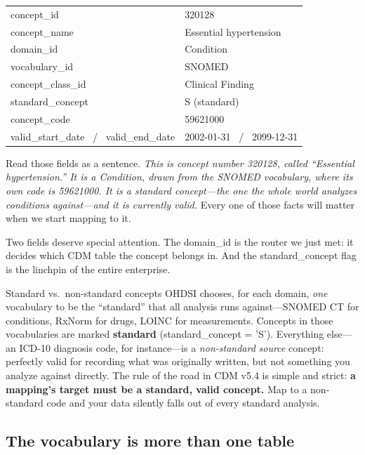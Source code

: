 \documentclass[12pt,openany]{book}
\newcommand{\code}[1]{{\ttfamily\small #1}}
\begin{document}
\begin{center}
\small\sffamily
\begin{tabular}{@{}ll@{}}
\toprule
\code{concept\_id} & \code{320128} \\
\code{concept\_name} & Essential hypertension \\
\code{domain\_id} & Condition \\
\code{vocabulary\_id} & SNOMED \\
\code{concept\_class\_id} & Clinical Finding \\
\code{standard\_concept} & \code{S} \quad\textrm{(standard)} \\
\code{concept\_code} & \code{59621000} \\
\code{valid\_start\_date} \ / \ \code{valid\_end\_date} & \code{2002-01-31} \ / \ \code{2099-12-31} \\
\bottomrule
\end{tabular}
\end{center}

Read those fields as a sentence. \emph{This is concept number 320128, called ``Essential
hypertension.'' It is a Condition, drawn from the SNOMED vocabulary, where its own code is 59621000.
It is a standard concept---the one the whole world analyzes conditions against---and it is currently
valid.} Every one of those facts will matter when we start mapping to it.

Two fields deserve special attention. The \code{domain\_id} is the router we just met: it decides
which CDM table the concept belongs in. And the \code{standard\_concept} flag is the linchpin of the
entire enterprise.

\begin{definition}{Standard vs.\ non-standard concepts}
OHDSI chooses, for each domain, \emph{one} vocabulary to be the ``standard'' that all analysis runs
against---SNOMED CT for conditions, RxNorm for drugs, LOINC for measurements. Concepts in those
vocabularies are marked \textbf{standard} (\code{standard\_concept = 'S'}). Everything else---an
ICD-10 diagnosis code, for instance---is a \emph{non-standard} \emph{source} concept: perfectly valid
for recording what was originally written, but not something you analyze against directly. The rule of
the road in CDM v5.4 is simple and strict: \textbf{a mapping's target must be a standard, valid
concept.} Map to a non-standard code and your data silently falls out of every standard analysis.
\end{definition}

\subsection{The vocabulary is more than one table}
\end{document}
